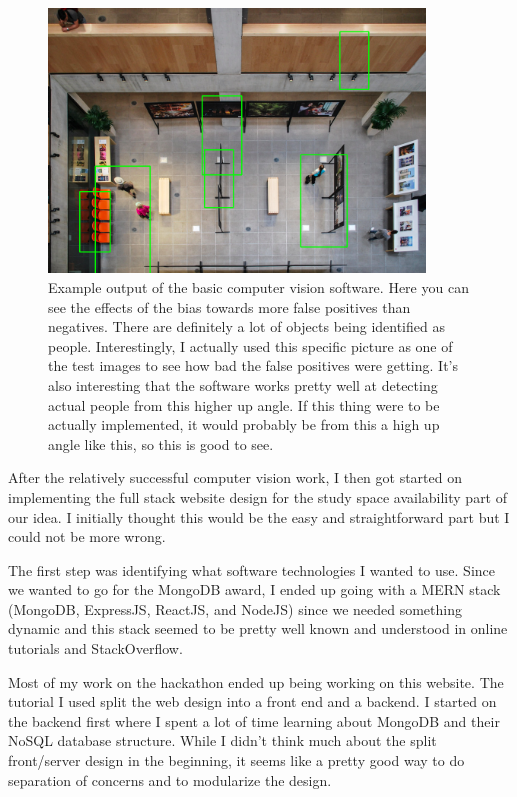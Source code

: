 \documentclass[a4paper,12pt]{gress}
\begin{document}
\begin{figure}[H]
  \begin{center}
  \includegraphics[width=100mm, scale=0.2]{pictures/myhal4.png}
  \caption{Example output of the basic computer vision software. Here you can see the effects of the bias towards more false positives than negatives. There are definitely a lot of objects being identified as people. Interestingly, I actually used this specific picture as one of the test images to see how bad the false positives were getting. It's also interesting that the software works pretty well at detecting actual people from this higher up angle. If this thing were to be actually implemented, it would probably be from this a high up angle like this, so this is good to see.}
  \end{center}
\end{figure}

After the relatively successful computer vision work, I then got started on implementing the full stack website design for the study space availability part of our idea. I initially thought this would be the easy and straightforward part but I could not be more wrong.

The first step was identifying what software technologies I wanted to use. Since we wanted to go for the MongoDB award, I ended up going with a MERN stack (MongoDB, ExpressJS, ReactJS, and NodeJS) since we needed something dynamic and this stack seemed to be pretty well known and understood in online tutorials and StackOverflow.

Most of my work on the hackathon ended up being working on this website. The tutorial I used split the web design into a front end and a backend. I started on the backend first where I spent a lot of time learning about MongoDB and their NoSQL database structure. While I didn't think much about the split front/server design in the beginning, it seems like a pretty good way to do separation of concerns and to modularize the design.
\end{document}
